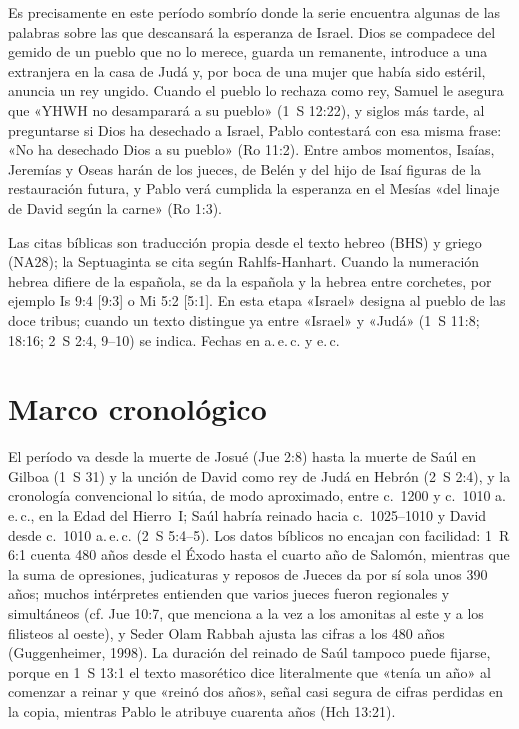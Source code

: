 Es precisamente en este período sombrío donde la serie encuentra algunas de las palabras sobre las que descansará la esperanza de Israel. Dios se compadece del gemido de un pueblo que no lo merece, guarda un remanente, introduce a una extranjera en la casa de Judá y, por boca de una mujer que había sido estéril, anuncia un rey ungido. Cuando el pueblo lo rechaza como rey, Samuel le asegura que «YHWH no desamparará a su pueblo» (1~S 12:22), y siglos más tarde, al preguntarse si Dios ha desechado a Israel, Pablo contestará con esa misma frase: «No ha desechado Dios a su pueblo» (Ro 11:2). Entre ambos momentos, Isaías, Jeremías y Oseas harán de los jueces, de Belén y del hijo de Isaí figuras de la restauración futura, y Pablo verá cumplida la esperanza en el Mesías «del linaje de David según la carne» (Ro 1:3).

\begin{nota}
Las citas bíblicas son traducción propia desde el texto hebreo (BHS) y griego (NA28); la Septuaginta se cita según Rahlfs-Hanhart. Cuando la numeración hebrea difiere de la española, se da la española y la hebrea entre corchetes, por ejemplo Is 9:4 [9:3] o Mi 5:2 [5:1]. En esta etapa «Israel» designa al pueblo de las doce tribus; cuando un texto distingue ya entre «Israel» y «Judá» (1~S 11:8; 18:16; 2~S 2:4, 9--10) se indica. Fechas en a.\,e.\,c. y e.\,c.
\end{nota}

\section{Marco cronológico}

El período va desde la muerte de Josué (Jue 2:8) hasta la muerte de Saúl en Gilboa (1~S 31) y la unción de David como rey de Judá en Hebrón (2~S 2:4), y la cronología convencional lo sitúa, de modo aproximado, entre c.~1200 y c.~1010 a.\,e.\,c., en la Edad del Hierro~I; Saúl habría reinado hacia c.~1025--1010 y David desde c.~1010 a.\,e.\,c. (2~S 5:4--5). Los datos bíblicos no encajan con facilidad: 1~R 6:1 cuenta 480 años desde el Éxodo hasta el cuarto año de Salomón, mientras que la suma de opresiones, judicaturas y reposos de Jueces da por sí sola unos 390 años; muchos intérpretes entienden que varios jueces fueron regionales y simultáneos (cf. Jue 10:7, que menciona a la vez a los amonitas al este y a los filisteos al oeste), y Seder Olam Rabbah ajusta las cifras a los 480 años (Guggenheimer, 1998). La duración del reinado de Saúl tampoco puede fijarse, porque en 1~S 13:1 el texto masorético dice literalmente que «tenía un año» al comenzar a reinar y que «reinó dos años», señal casi segura de cifras perdidas en la copia, mientras Pablo le atribuye cuarenta años (Hch 13:21).

